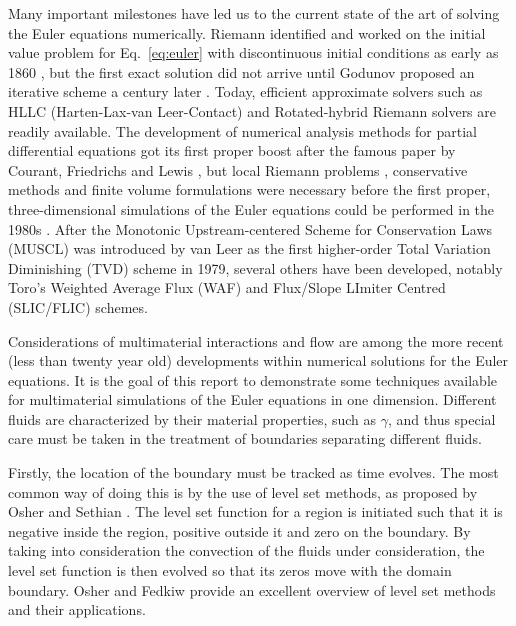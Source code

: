 \documentclass[final,3p,twocolumn]{elsarticle}
\begin{document}
Many important milestones have led us to the current state of the art of
solving the Euler equations numerically. Riemann identified and worked on the
initial value problem for Eq.\ \eqref{eq:euler} with discontinuous initial
conditions as early as 1860 \cite{riemann1860fortpflanzung}, but the first
exact solution did not arrive until Godunov proposed an iterative scheme a
century later \cite{godunov1959difference}. Today, efficient approximate
solvers such as HLLC (Harten-Lax-van Leer-Contact) \cite{toro1994restoration}
and Rotated-hybrid Riemann solvers \cite{nishikawa2008very} are readily
available. The development of numerical analysis methods for partial
differential equations got its first proper boost after the famous paper by
Courant, Friedrichs and Lewis \cite{courant1928partiellen}, but local Riemann
problems \cite{godunov1959difference}, conservative methods
\cite{lax1960systems} and finite volume formulations \cite{leveque2002finite}
were necessary before the first proper, three-dimensional simulations of the
Euler equations could be performed in the 1980s \cite{jameson1981numerical}.
After the Monotonic Upstream-centered Scheme for Conservation Laws (MUSCL)
\cite{van1979towards} was introduced by van Leer as the first higher-order
Total Variation Diminishing (TVD) scheme in 1979, several others have been
developed, notably Toro's Weighted Average Flux (WAF) \cite{toro1989weighted} and
Flux/Slope LImiter Centred (SLIC/FLIC) \cite{toro2000centred} schemes. 

Considerations of multimaterial interactions and flow are among the more recent
(less than twenty year old) developments within numerical solutions for the
Euler equations. It is the goal of this report to demonstrate some techniques
available for multimaterial simulations of the Euler equations in one
dimension. Different fluids are characterized by their material properties,
such as $\gamma$, and thus special care must be taken in the treatment of
boundaries separating different fluids. 

Firstly, the location of the boundary must be tracked as time evolves. The most
common way of doing this is by the use of level set methods, as proposed by
Osher and Sethian \cite{osher1988fronts}. The level set function for a region
is initiated such that it is negative inside the region, positive outside it
and zero on the boundary. By taking into consideration the convection of the
fluids under consideration, the level set function is then evolved so that its
zeros move with the domain boundary. Osher and Fedkiw \cite{osher2001level}
provide an excellent overview of level set methods and their applications. 
\end{document}
